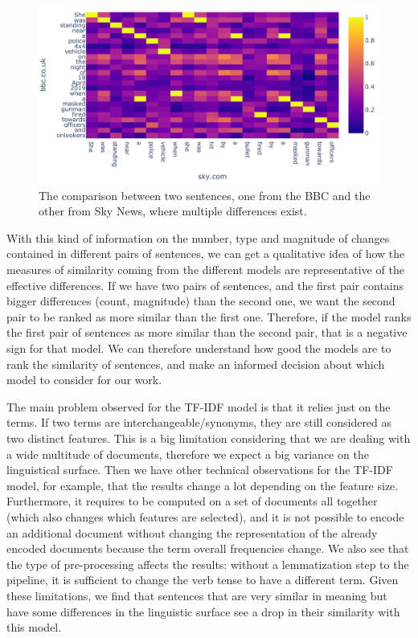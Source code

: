 \begin{figure}[!htbp]
    \centering
    \includegraphics[width=0.9\linewidth]{figures/lyra.pdf}
    \caption{The comparison between two sentences, one from the BBC and the other from Sky News, where multiple differences exist.}
    \label{fig:lyra}
\end{figure}


With this kind of information on the number, type and magnitude of changes contained in different pairs of sentences, we can get a qualitative idea of how the measures of similarity coming from the different models are representative of the effective differences.
If we have two pairs of sentences, and the first pair contains bigger differences (count, magnitude) than the second one, we want the second pair to be ranked as more similar than the first one.
Therefore, if the model ranks the first pair of sentences as more similar than the second pair, that is a negative sign for that model. %
We can therefore understand how good the models are to rank the similarity of sentences, and make an informed decision about which model to consider for our work.


The main problem observed for the TF-IDF model is that it relies just on the terms. If two terms are interchangeable/synonyms, they are still considered as two distinct features. This is a big limitation considering that we are dealing with a wide multitude of documents,  %
therefore we expect a big variance on the linguistical surface.
Then we have other technical observations for the TF-IDF model, for example, that the results change a lot depending on the feature size.
Furthermore, it requires to be computed on a set of documents all together (which also changes which features are selected), and it is not possible to encode an additional document without changing the representation of the already encoded documents because the term overall frequencies change.
We also see that the type of pre-processing affects the results: without a lemmatization step to the pipeline, it is sufficient to change the verb tense to have a different term.
Given these limitations, we find that sentences that are very similar in meaning but have some differences in the linguistic surface see a drop in their similarity with this model.

